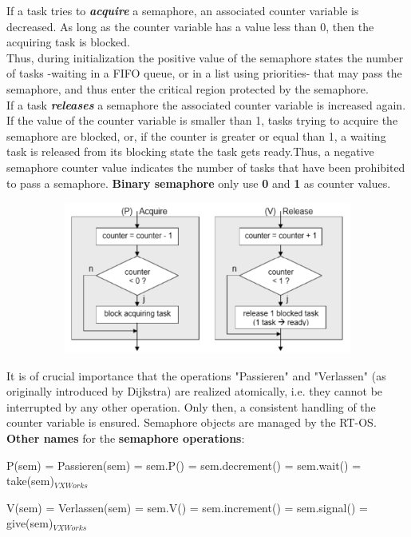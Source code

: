 If a task tries to \textbf{\textit{acquire}} a semaphore, an associated counter variable is decreased. As long as the counter variable has a value less than 0, then the acquiring task is blocked.\\

Thus, during initialization the positive value of the semaphore states the number of tasks -waiting in a FIFO queue, or in a list using priorities- that may pass the semaphore, and thus enter the critical region protected by the semaphore.\\

If a task \textbf{\textit{releases}} a semaphore the associated counter variable is increased again. If the value of the counter variable is smaller than 1, tasks trying to acquire the semaphore are blocked, or, if the counter is greater or equal than 1, a waiting task is released from its blocking state  the task gets ready.Thus, a negative semaphore counter value indicates the number of tasks that have been prohibited to pass a semaphore. \textbf{Binary semaphore} only use \textbf{0} and \textbf{1} as counter values.

 	\begin{figure}[h]
    \centering
    \includegraphics[width=12cm, height=5cm]{Images/image105.png}
    \label{fig:Fig }
    \end{figure}
\newpage
It is of crucial importance that the operations "Passieren" and "Verlassen" (as originally introduced by Dijkstra) are realized atomically, i.e. they cannot be interrupted by any other operation. Only then, a consistent handling of the counter variable is ensured. Semaphore objects are managed by the RT-OS.\\

\textbf{Other names} for the \textbf{semaphore operations}:

P(sem) = Passieren(sem) = sem.P() = sem.decrement() = sem.wait() = take(sem)${}_{VXWorks}$

V(sem) = Verlassen(sem) = sem.V() = sem.increment()  = sem.signal() = give(sem)${}_{VXWorks}$\\


